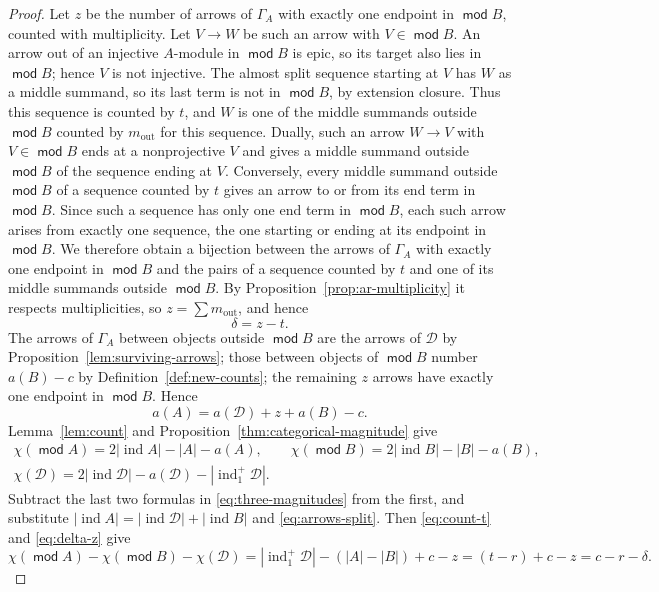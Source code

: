 \documentclass[a4paper,reqno,10pt]{amsart}
\theoremstyle{definition}
\numberwithin{equation}{section}
\DeclareMathOperator{\moduleCategory}{\mathsf{mod}}
\renewcommand{\mod}{\moduleCategory}
\DeclareMathOperator{\ind}{ind}
\newcommand{\cD}{\mathcal D}
\begin{document}
\begin{proof}
Let \(z\) be the number of arrows of \(\Gamma_A\) with exactly one
endpoint in \(\mod B\), counted with multiplicity. Let \(V\to W\) be such
an arrow with \(V\in\mod B\). An arrow out of an injective \(A\)-module in \(\mod B\) is epic, so
its target also lies in \(\mod B\); hence \(V\) is not injective. The almost
split sequence starting at \(V\) has \(W\) as a middle summand, so its last
term is not in \(\mod B\), by extension closure. Thus this sequence is counted
by \(t\), and \(W\) is one of the middle summands outside \(\mod B\) counted
by \(m_{\mathrm{out}}\) for this sequence. Dually, such an arrow \(W\to V\) with \(V\in\mod B\) ends at a
nonprojective \(V\) and gives a middle summand outside \(\mod B\) of the
sequence ending at \(V\). Conversely, every middle summand outside \(\mod B\)
of a sequence counted by \(t\) gives an arrow to or from its end term in
\(\mod B\). Since such a sequence has only one end term in \(\mod B\), each
such arrow arises from exactly one sequence, the one starting or ending at
its endpoint in \(\mod B\). We therefore obtain a bijection between the
arrows of \(\Gamma_A\) with exactly one endpoint in \(\mod B\) and the
pairs of a sequence counted by \(t\) and one of its middle summands
outside \(\mod B\). By Proposition~\ref{prop:ar-multiplicity} it
respects multiplicities, so \(z=\sum m_{\mathrm{out}}\), and hence
\begin{equation}\label{eq:delta-z}
 \delta=z-t.
\end{equation}
The arrows of \(\Gamma_A\) between objects outside \(\mod B\) are the
arrows of \(\cD\) by Proposition~\ref{lem:surviving-arrows}; those between
objects of \(\mod B\) number \(a(B)-c\) by Definition~\ref{def:new-counts};
the remaining \(z\) arrows have exactly one endpoint in \(\mod B\). Hence
\begin{equation}\label{eq:arrows-split}
 a(A)=a(\cD)+z+a(B)-c.
\end{equation}
Lemma~\ref{lem:count} and Proposition~\ref{thm:categorical-magnitude} give
\begin{equation}\label{eq:three-magnitudes}
\begin{gathered}
 \chi(\mod A)=2|\ind A|-|A|-a(A),\qquad
 \chi(\mod B)=2|\ind B|-|B|-a(B),\\
 \chi(\cD)=2|\ind\cD|-a(\cD)-|\ind_1^+\cD|.
\end{gathered}
\end{equation}
Subtract the last two formulas in \eqref{eq:three-magnitudes} from the
first, and substitute \(|\ind A|=|\ind\cD|+|\ind B|\) and
\eqref{eq:arrows-split}. Then \eqref{eq:count-t} and \eqref{eq:delta-z}
give
\[
 \chi(\mod A)-\chi(\mod B)-\chi(\cD)=|\ind_1^+\cD|-(|A|-|B|)+c-z
 =(t-r)+c-z=c-r-\delta.
\]
\end{proof}
\end{document}
